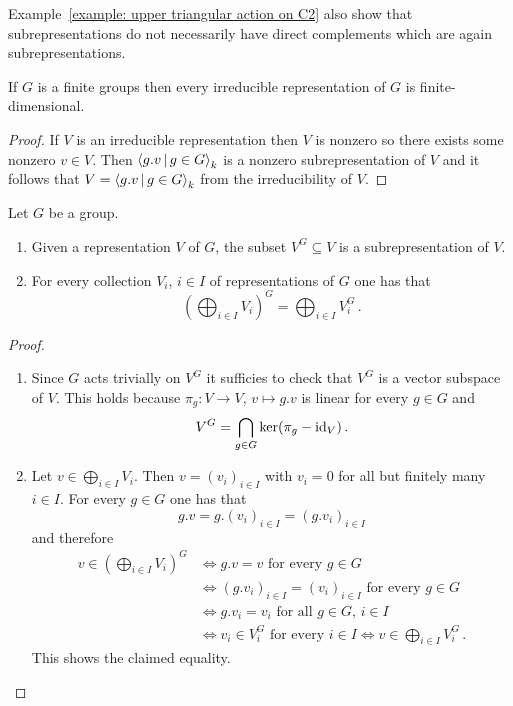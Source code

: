 \begin{warning}
  Example~\ref{example: upper triangular action on C2} also show that subrepresentations do not necessarily have direct complements which are again subrepresentations.
\end{warning}


\begin{lemma}
  \label{lemma: irred rep of finite groups are fd}
  If $G$ is a finite groups then every irreducible representation of $G$ is finite-dimensional.
\end{lemma}


\begin{proof}
  If $V$ is an irreducible representation then $V$ is nonzero so there exists some nonzero $v \in V$.
  Then $\gen{ g.v \suchthat g \in G }_k$ is a nonzero subrepresentation of $V$ and it follows that $V = \gen{ g.v \suchthat g \in G }_k$ from the irreducibility of $V$.
\end{proof}


\begin{lemma}\label{lemma: direct sum and invariants commute}
  Let $G$ be a group.
  \begin{enumerate}
    \item
      Given a representation $V$ of $G$, the subset $V^G \subseteq V$ is a subrepresentation of $V$.
    \item
      For every collection $V_i$, $i \in I$ of representations of $G$ one has that
      \[
          \left(
            \bigoplus_{i \in I} V_i
          \right)^G
        = \bigoplus_{i \in I} V_i^G \,.
      \]
  \end{enumerate}
\end{lemma}
\begin{proof}
  \leavevmode
  \begin{enumerate}
    \item
      Since $G$ acts trivially on $V^G$ it sufficies to check that $V^G$ is a vector subspace of $V$.
      This holds because $\pi_g \colon V \to V$, $v \mapsto g.v$ is linear for every $g \in G$ and
      \[
          V^G
        = \bigcap_{g \in G} \ker(\pi_g - \operatorname{id}_V) \,.
      \]
    \item
      Let $v \in \bigoplus_{i \in I} V_i$.
      Then $v = (v_i)_{i \in I}$ with $v_i = 0$ for all but finitely many $i \in I$.
      For every $g \in G$ one has that
      \[
          g.v
        = g.(v_i)_{i \in I}
        = (g.v_i)_{i \in I}
      \]
      and therefore
      \begin{align*}
              v \in \left( \bigoplus_{i \in I} V_i \right)^G
        &\iff \text{$g.v = v$ for every $g \in G$}  \\
        &\iff \text{$(g.v_i)_{i \in I} = (v_i)_{i \in I}$ for every $g \in G$} \\
        &\iff \text{$g.v_i = v_i$ for all $g \in G$, $i \in I$} \\
        &\iff \text{$v_i \in V_i^G$ for every $i \in I$}
         \iff v \in \bigoplus_{i \in I} V_i^G \,.
      \end{align*}
      This shows the claimed equality.
  \qedhere
  \end{enumerate}
\end{proof}


